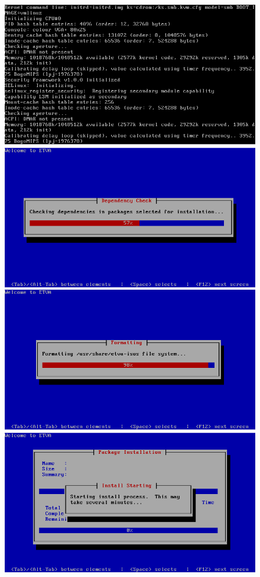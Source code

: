 \begin{figure}[H]
	\begin{center}
	\includegraphics[scale=0.4]{screenshots/install_etva2.png}
    \includegraphics[scale=0.4]{screenshots/install_etva3.png}    
    \includegraphics[scale=0.4]{screenshots/install_etva4.png}
    \includegraphics[scale=0.4]{screenshots/install_etva5.png}    

\end{center}
\end{figure}

